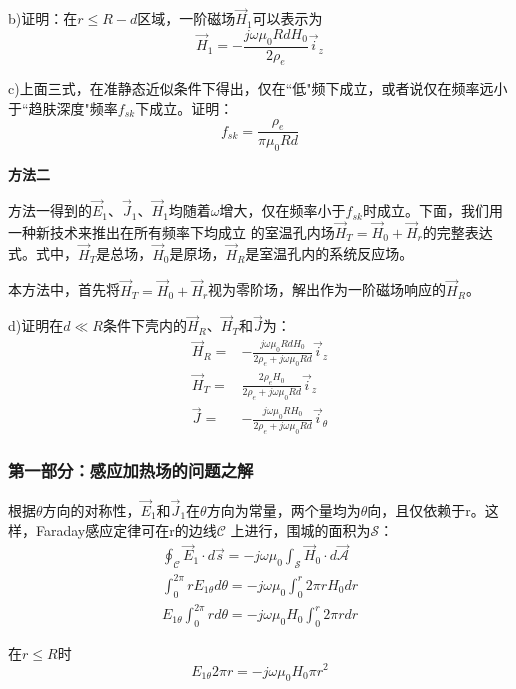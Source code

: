 b)证明：在$r\le R-d$区域，一阶磁场$\vec{H}_1$可以表示为
\begin{equation}
\vec{H}_1=-\frac{j\omega \mu_0 R d H_0}{2\rho_e}\vec{i}_z
\end{equation} 

c)上面三式，在准静态近似条件下得出，仅在``低"频下成立，或者说仅在频率远小于``趋肤深度"频率$f_{sk}$下成立。证明：
\begin{equation}
f_{sk}=\frac{\rho_e}{\pi \mu_0 R d}
\end{equation}

\textbf{方法二}

方法一得到的$\vec{E}_1$、$\vec{J}_1$、$\vec{H}_1$均随着$\omega$增大，仅在频率小于$f_{sk}$时成立。下面，我们用一种新技术来推出在所有频率下均成立
的室温孔内场$\vec{H}_T=\vec{H}_0+\vec{H}_r$的完整表达式。式中，$\vec{H}_T$是总场，$\vec{H}_0$是原场，$\vec{H}_R$是室温孔内的系统反应场。

本方法中，首先将$\vec{H}_T=\vec{H}_0+\vec{H}_r$视为零阶场，解出作为一阶磁场响应的$\vec{H}_R$。

d)证明在$d\ll R$条件下壳内的$\vec{H}_R$、$\vec{H}_T$和$\vec{J}$为：
\begin{align}
\vec{H}_R=&-\frac{j\omega \mu_0 R d H_0}{2\rho_e+j\omega \mu_0 R d} \vec{i}_z\\
\vec{H}_T=&\frac{2\rho_e H_0}{2\rho_e+j\omega \mu_0 R d} \vec{i}_z\\
\vec{J}=&-\frac{j\omega \mu_0 R H_0}{2\rho_e+j\omega \mu_0 R d} \vec{i}_\theta
\end{align}

\subsubsection*{第一部分：感应加热场的问题之解}
根据$\theta$方向的对称性，$\vec{E}_1$和$\vec{J}_1$在$\theta$方向为常量，两个量均为$\theta$向，且仅依赖于r。这样，Faraday感应定律可在r的边线$\mathcal{C}$
上进行，围城的面积为$\mathcal{S}$：
\begin{align}
\oint_{\mathcal{C}} \vec{E}_1 \cdot d\vec{s}=-j\omega \mu_0 \int_{\mathcal{S}} \vec{H}_0 \cdot d\vec{\mathcal{A}}\nonumber\\
\int_{0}^{2\pi} r E_{1\theta} d\theta=-j\omega \mu_0 \int_{0}^{r} 2\pi r H_0 dr\nonumber\\
E_{1\theta}\int_{0}^{2\pi} r d\theta=-j\omega \mu_0 H_0\int_{0}^{r} 2\pi r dr\nonumber\tag{S7.1}
\end{align}

在$r\le R$时
\begin{equation*}
E_{1\theta} 2\pi r = -j\omega \mu_0 H_0 \pi r^2 \tag{S7.2}
\end{equation*}

